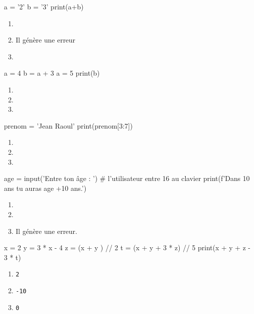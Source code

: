 \documentclass[a4paper,10pt]{article}
\begin{document}
\begin{multicols}{2}
\begin{pythoncode}
a = '2'
b = '3'
print(a+b)
\end{pythoncode}
\begin{enumerate}[\case\ \ a.]
\item    {}
\item    Il génère une erreur
\item    {}
\end{enumerate}

\newpage
\begin{pythoncode}
a = 4
b = a + 3
a = 5
print(b)
\end{pythoncode}
\begin{enumerate}[\case\ \ a.]
\item    {}
\item {}
\item {}
\end{enumerate}

\begin{pythoncode}
prenom = 'Jean Raoul'
print(prenom[3:7])
\end{pythoncode}
\begin{enumerate}[\case\ \ a.]
\item    {}
\item    {}
\item    {}
\end{enumerate}
\columnbreak
\begin{pythoncode}
age = input('Entre ton âge : ')
# l'utilisateur entre 16 au clavier
print(f'Dans 10 ans tu auras {age +10} ans.')
\end{pythoncode}

\begin{enumerate}[\case\ \ a.]
\item    {}
\item    {}
\item    Il génère une erreur.
\end{enumerate}

\begin{pythoncode}
x = 2
y = 3 * x - 4
z = (x + y ) // 2
t = (x + y + 3 * z) // 5
print(x + y + z - 3 * t)
\end{pythoncode}

\begin{enumerate}[\case\ \ a.]
\item    \texttt{2}
\item    \texttt{-10}
\item    \texttt{0}
\end{enumerate}

\end{multicols}
\end{document}
